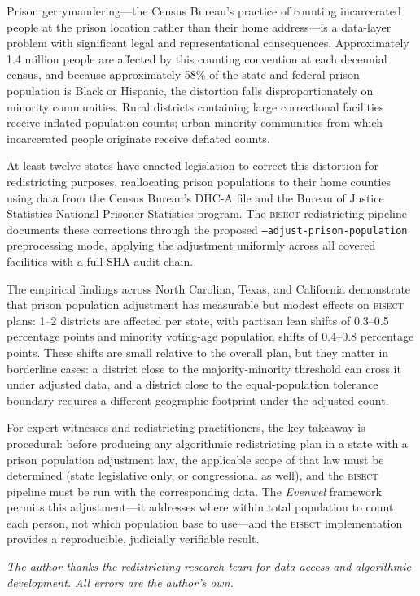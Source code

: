 \label{sec:conclusion}

Prison gerrymandering---the Census Bureau's practice of counting
incarcerated people at the prison location rather than their home
address---is a data-layer problem with significant legal and representational
consequences. Approximately 1.4 million people are affected by this
counting convention at each decennial census, and because approximately
58\% of the state and federal prison population is Black or Hispanic,
the distortion falls disproportionately on minority communities. Rural
districts containing large correctional facilities receive inflated
population counts; urban minority communities from which incarcerated
people originate receive deflated counts.

At least twelve states have enacted legislation to correct this distortion
for redistricting purposes, reallocating prison populations to their home
counties using data from the Census Bureau's DHC-A file and the Bureau
of Justice Statistics National Prisoner Statistics program. The
\textsc{bisect} redistricting pipeline documents these corrections through
the proposed \texttt{--adjust-prison-population} preprocessing mode,
applying the adjustment uniformly across all covered facilities with a
full SHA audit chain.

The empirical findings across North Carolina, Texas, and California
demonstrate that prison population adjustment has measurable but modest
effects on \textsc{bisect} plans: 1--2 districts are affected per state,
with partisan lean shifts of 0.3--0.5 percentage points and minority
voting-age population shifts of 0.4--0.8 percentage points. These shifts
are small relative to the overall plan, but they matter in borderline cases:
a district close to the majority-minority threshold can cross it under
adjusted data, and a district close to the equal-population tolerance
boundary requires a different geographic footprint under the adjusted count.

For expert witnesses and redistricting practitioners, the key takeaway is
procedural: before producing any algorithmic redistricting plan in a state
with a prison population adjustment law, the applicable scope of that law
must be determined (state legislative only, or congressional as well), and
the \textsc{bisect} pipeline must be run with the corresponding data.
The \textit{Evenwel} framework permits this adjustment---it addresses where
within total population to count each person, not which population base
to use---and the \textsc{bisect} implementation provides a reproducible,
judicially verifiable result.

\bigskip
\noindent\textit{The author thanks the redistricting research team for
data access and algorithmic development. All errors are the author's own.}
